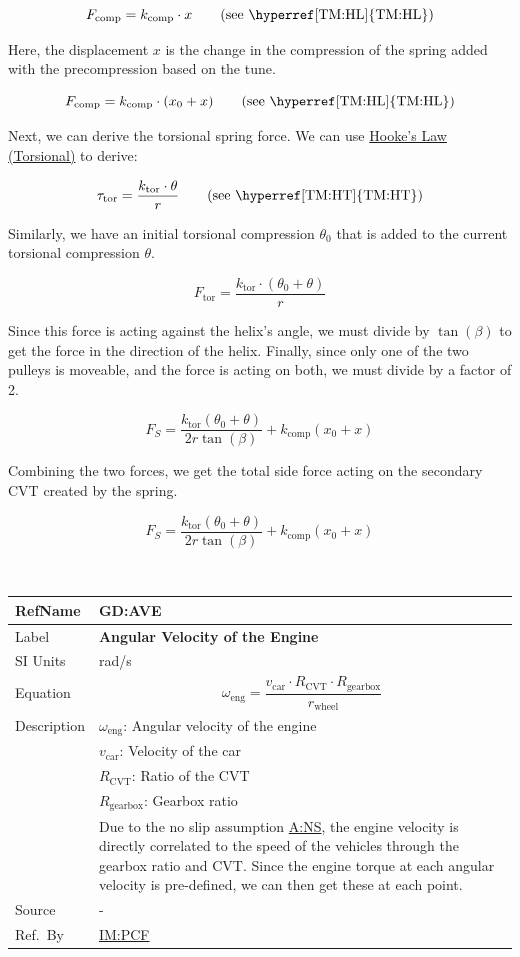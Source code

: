 \documentclass[12pt]{article}
\newcommand{\colAwidth}{0.13\textwidth}
\newcommand{\colBwidth}{0.82\textwidth}
\newcommand{\hpref}[1]{\hyperref[#1]{#1}}
\newcommand{\defgeneral}[7] {
~\newline
\noindent
\begin{minipage}{\textwidth}
\renewcommand*{\arraystretch}{1.5}
\begin{tabular}{| p{\colAwidth} | p{\colBwidth}|}
  \hline
  \rowcolor[gray]{0.9}
  RefName& \textbf{#1} \label{#1}\\
  \hline
  Label& \bf #2 \\
  \hline
  SI Units& #3\\
  \hline
  Equation& #4\\
  \hline
  Description& #5 \\
  \hline
  Source& #6 \\
  \hline
  Ref.\ By & #7\\
  \hline
\end{tabular}
\end{minipage}\\
}
\begin{document}
\[ F_{\text{comp}} = k_{\text{comp}} \cdot x \tag*{\text{(see \hyperref[TM:HL]{TM:HL})}}\]

Here, the displacement $x$ is the change in the compression of the spring added with the precompression based on the tune.

\[ F_{\text{comp}} = k_{\text{comp}} \cdot (x_0 + x) \tag*{\text{(see \hyperref[TM:HL]{TM:HL})}}\]

Next, we can derive the torsional spring force. We can use \hyperref[TM:HT]{Hooke's Law (Torsional)} to derive:

\[ \tau_{\text{tor}} = \frac{k_{\text{tor}} \cdot \theta}{r} \tag*{\text{(see \hyperref[TM:HT]{TM:HT})}}\]

Similarly, we have an initial torsional compression $\theta_0$ that is added to the current torsional compression $\theta$.

\[ F_{\text{tor}} = \frac{k_{\text{tor}} \cdot (\theta_0 + \theta)}{r} \]

Since this force is acting against the helix's angle, we must divide by $\tan(\beta)$ to get the force in the direction of the helix. Finally, since only one of the two pulleys is moveable, and the force is acting on both, we must divide by a factor of 2.

\[ F_S = \frac{k_{\text{tor}}(\theta_0 + \theta)}{2r\tan(\beta)} + k_\text{comp}(x_0 + x) \]

Combining the two forces, we get the total side force acting on the secondary CVT created by the spring.

\[ F_S = \frac{k_{\text{tor}}(\theta_0 + \theta)}{2r\tan(\beta)} + k_\text{comp}(x_0 + x) \]

\defgeneral
{GD:AVE}
{Angular Velocity of the Engine} %
{rad/s} %
{
  \[ \omega_\text{eng} = \frac{v_\text{car} \cdot R_{\text{CVT}} \cdot R_\text{gearbox}}{r_\text{wheel}} \]
} %
{ 
$\omega_\text{eng}$: Angular velocity of the engine\\
& $v_\text{car}$: Velocity of the car\\
& $R_{\text{CVT}}$: Ratio of the CVT\\
& $R_\text{gearbox}$: Gearbox ratio\\
& Due to the no slip assumption \hpref{A:NS}, the engine velocity is directly correlated to the speed of the vehicles through the gearbox ratio and CVT. Since the engine torque at each angular velocity is pre-defined, we can then get these at each point.
}  %
{-} %
{\hpref{IM:PCF}} %
\end{document}

